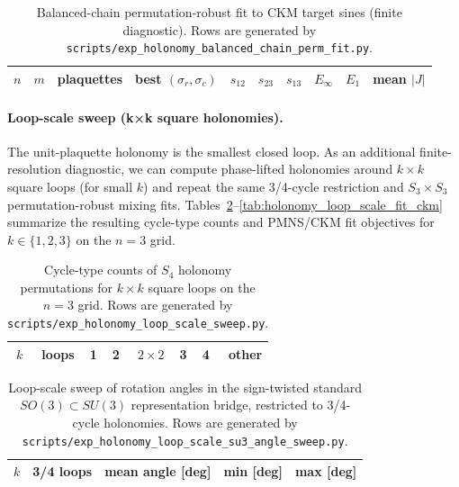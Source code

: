 \begin{table}[t]
\centering
\scriptsize
\setlength{\tabcolsep}{4pt}
\renewcommand{\arraystretch}{1.15}
\begin{tabular}{rrrrrrrrrr}
\toprule
$n$ & $m$ & plaquettes & best $(\sigma_r,\sigma_c)$ & $s_{12}$ & $s_{23}$ & $s_{13}$ & $E_\infty$ & $E_1$ & mean $|J|$ \\
\midrule
%
\end{tabular}
\caption{Balanced-chain permutation-robust fit to CKM target sines (finite diagnostic). Rows are generated by \texttt{scripts/exp\_holonomy\_balanced\_chain\_perm\_fit.py}.}
\label{tab:holonomy_balanced_chain_fit_ckm}
\end{table}

\paragraph{Loop-scale sweep (k×k square holonomies).}
The unit-plaquette holonomy is the smallest closed loop.
As an additional finite-resolution diagnostic, we can compute phase-lifted holonomies around $k\times k$ square loops (for small $k$) and repeat the same 3/4-cycle restriction and $S_3\times S_3$ permutation-robust mixing fits.
Tables~\ref{tab:holonomy_loop_scale_cycle}--\ref{tab:holonomy_loop_scale_fit_ckm} summarize the resulting cycle-type counts and PMNS/CKM fit objectives for $k\in\{1,2,3\}$ on the $n=3$ grid.

\begin{table}[t]
\centering
\scriptsize
\setlength{\tabcolsep}{6pt}
\renewcommand{\arraystretch}{1.15}
\begin{tabular}{rrrrrrrr}
\toprule
$k$ & loops & 1 & 2 & $2\times 2$ & 3 & 4 & other \\
\midrule
%
\end{tabular}
\caption{Cycle-type counts of $S_4$ holonomy permutations for $k\times k$ square loops on the $n=3$ grid. Rows are generated by \texttt{scripts/exp\_holonomy\_loop\_scale\_sweep.py}.}
\label{tab:holonomy_loop_scale_cycle}
\end{table}

\begin{table}[t]
\centering
\scriptsize
\setlength{\tabcolsep}{8pt}
\renewcommand{\arraystretch}{1.15}
\begin{tabular}{rrrrr}
\toprule
$k$ & 3/4 loops & mean angle [deg] & min [deg] & max [deg] \\
\midrule
%
\end{tabular}
\caption{Loop-scale sweep of rotation angles in the sign-twisted standard $SO(3)\subset SU(3)$ representation bridge, restricted to 3/4-cycle holonomies. Rows are generated by \texttt{scripts/exp\_holonomy\_loop\_scale\_su3\_angle\_sweep.py}.}
\label{tab:holonomy_loop_scale_su3_angle}
\end{table}

